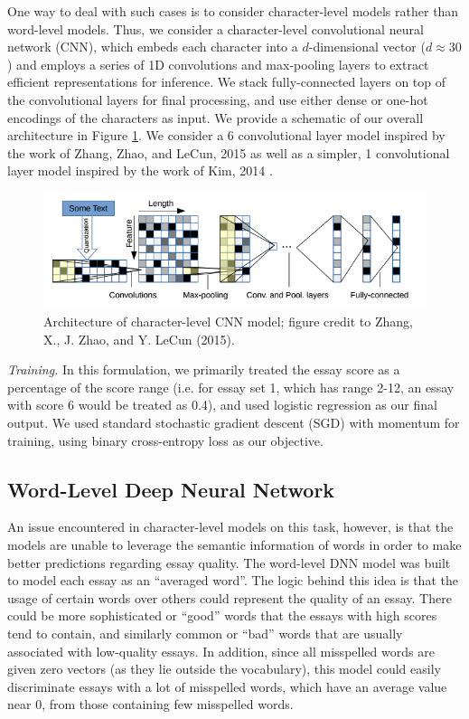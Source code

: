 \documentclass[10pt,psamsfonts]{amsart}
\theoremstyle{definition}
\theoremstyle{remark}
\numberwithin{equation}{section}
\begin{document}
One way to deal with such cases is to consider character-level models rather than word-level models. Thus, we consider a character-level convolutional neural network (CNN), which embeds each character into a $d$-dimensional vector ($d \approx 30$) and employs a series of 1D convolutions and max-pooling layers to extract efficient representations for inference. We stack fully-connected layers on top of the convolutional layers for final processing, and use either dense or one-hot encodings of the characters as input. We provide a schematic of our overall architecture in Figure \ref{fig:cnn}. We consider a 6 convolutional layer model inspired by the work of Zhang, Zhao, and LeCun, 2015 \cite{charnn} as well as a simpler, 1 convolutional layer model inspired by the work of Kim, 2014 \cite{kim14}.

\begin{figure}
	\includegraphics[width=\textwidth]{cnn.png}
	\caption{Architecture of character-level CNN model; figure credit to Zhang, X., J. Zhao, and Y. LeCun (2015).}
	\label{fig:cnn}
\end{figure}

{\em Training.} In this formulation, we primarily treated the essay score as a percentage of the score range (i.e. for essay set 1, which has range 2-12, an essay with score 6 would be treated as 0.4), and used logistic regression as our final output. We used standard stochastic gradient descent (SGD) with momentum for training, using binary cross-entropy loss as our objective.

\subsection*{Word-Level Deep Neural Network}

An issue encountered in character-level models on this task, however, is that the models are unable to leverage the semantic information of words in order to make better predictions regarding essay quality. The word-level DNN model was built to model each essay as an ``averaged word''. The logic behind this idea is that the usage of certain words over others could represent the quality of an essay. There could be more sophisticated or ``good'' words that the essays with high scores tend to contain, and similarly common or ``bad'' words that are usually associated with low-quality essays. In addition, since all misspelled words are given zero vectors (as they lie outside the vocabulary), this model could easily discriminate essays with a lot of misspelled words, which have an average value near 0, from those containing few misspelled words. 
\end{document}
